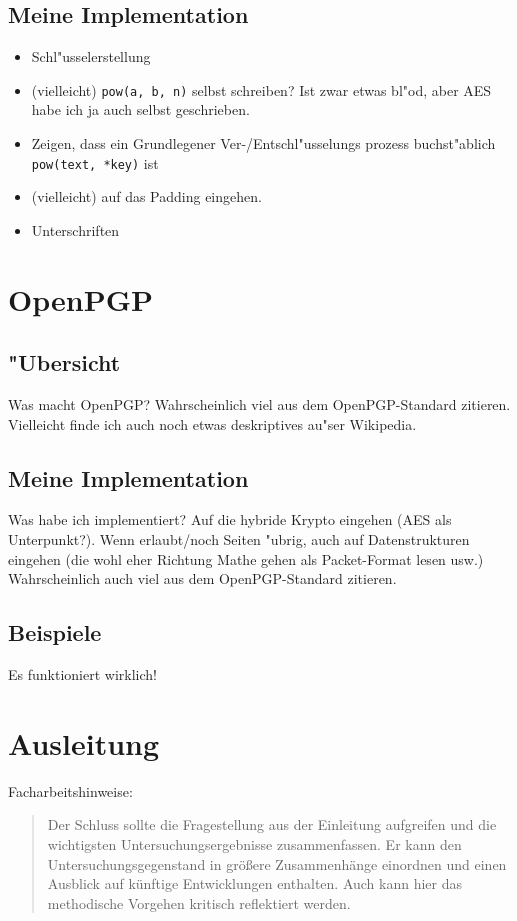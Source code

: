 \documentclass[12pt]{article}
\begin{document}
\subsection{Meine Implementation}
\begin{itemize}
\item Schl"usselerstellung
\item (vielleicht) \verb|pow(a, b, n)| selbst schreiben? Ist zwar etwas bl"od, aber AES habe ich ja auch selbst geschrieben.
\item Zeigen, dass ein Grundlegener Ver-/Entschl"usselungs prozess buchst"ablich \verb|pow(text, *key)| ist
\item (vielleicht) auf das Padding eingehen.
\item Unterschriften
\end{itemize}

\section{OpenPGP}
\subsection{"Ubersicht}
Was macht OpenPGP?
Wahrscheinlich viel aus dem OpenPGP-Standard zitieren. Vielleicht finde ich auch noch etwas deskriptives au"ser Wikipedia.
\subsection{Meine Implementation}
Was habe ich implementiert? Auf die hybride Krypto eingehen (AES als Unterpunkt?). Wenn erlaubt/noch Seiten "ubrig, auch auf Datenstrukturen eingehen (die wohl eher Richtung Mathe gehen als Packet-Format lesen usw.)
Wahrscheinlich auch viel aus dem OpenPGP-Standard zitieren.
\subsection{Beispiele}
Es funktioniert wirklich!

\section{Ausleitung}
Facharbeitshinweise:
\begin{quote}
Der Schluss sollte die Fragestellung aus der Einleitung aufgreifen und die wichtigsten Untersuchungsergebnisse zusammenfassen. Er kann den Untersuchungsgegenstand in größere Zusammenhänge einordnen und einen Ausblick auf künftige Entwicklungen enthalten. Auch kann hier das methodische Vorgehen kritisch reflektiert werden.
\end{quote}
\end{document}
